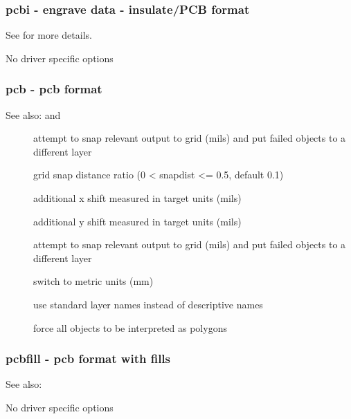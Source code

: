 \documentclass[english,a4paper]{article}
\begin{document}
\subsubsection{pcbi - engrave data - insulate/PCB format}
See  for more details.

No driver specific options
\subsubsection{pcb - pcb format}
See also:  and 

\begin{description}
\item[]
attempt to snap relevant output to grid (mils) and put failed objects to a different layer


\item[]
grid snap distance ratio (0 < snapdist <= 0.5, default 0.1)


\item[]
additional x shift measured in target units (mils)


\item[]
additional y shift measured in target units (mils)


\item[]
attempt to snap relevant output to grid (mils) and put failed objects to a different layer


\item[]
switch to metric units (mm)


\item[]
use standard layer names instead of descriptive names


\item[]
force all objects to be interpreted as polygons


\end{description}
\subsubsection{pcbfill - pcb format with fills}
See also: 

No driver specific options
\end{document}
